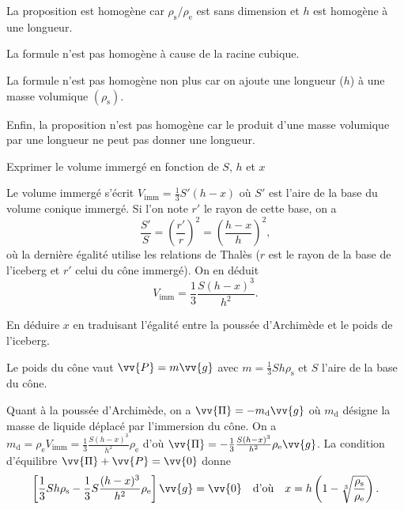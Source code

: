 \reponse{\reponseA}

\begin{corrige}
La proposition \reponseA{} est homogène car $\rho_\text{s}/\rho_\text{e}$ est sans dimension et $h$ est homogène à une longueur.

La formule \reponseB{} n'est pas homogène à cause de la racine cubique.

La formule \reponseC{} n'est pas homogène non plus car on ajoute une longueur ($h$) à une masse volumique $(\rho_\text{s})$.

Enfin, la proposition \reponseD{} n'est pas homogène car le produit d'une masse volumique par une longueur ne peut pas donner une longueur.
\end{corrige}

\begin{enonce}
Exprimer le volume immergé en fonction de $S$, $h$ et $x$
\end{enonce}


\begin{corrige}
Le volume immergé s'écrit $V_\text{imm}=\frac13 S'(h-x)$ où $S'$ est l'aire de la base du volume conique immergé. Si l'on note $r'$ le rayon de cette base, on a 
\[
\frac{S'}{S}=\left(\frac{r'}{r}\right)^2=\left(\frac{h-x}{h}\right)^2,	
\]
où la dernière égalité utilise les relations de Thalès ($r$ est le rayon de la base de l'iceberg et $r'$ celui du cône immergé). On en déduit 
\[
V_\text{imm}=\frac13 \frac{S(h-x)^3}{h^2}.
\]
\end{corrige}


\begin{enonce}
En déduire $x$ en traduisant l'égalité entre la poussée d'Archimède et le poids de l'iceberg.\\\mbox{}
\end{enonce}


\begin{corrige}
Le poids du cône vaut $\vv{P}=m\vv{g}$ avec $m=\frac13 Sh\rho_\text{s}$ et $S$ l'aire de la base du cône.

Quant à la poussée d'Archimède, on a $\vv{\Pi}=-m_\text{d}\vv{g}$ où $m_\text{d}$ désigne la masse de liquide déplacé par l'immersion du cône. On a $m_\text{d}=\rho_\text{e}V_\text{imm}=\frac13 \frac{S(h-x)^3}{h^2}\rho_\text{e}$ d'où $\vv{\Pi}=-\frac13 \frac{S(h-x)^3}{h^2}\rho_\text{e}\vv{g}
$. 
La condition d'équilibre $\vv{\Pi}+\vv{P}=\vv{0}$ donne 
\[
\left[\frac13 Sh\rho_\text{s}-\frac13 S\frac{(h-x)^3}{h^2}\rho_\text{e}\right]\vv{g}=\vv{0}
\quad\text{d'où}\quad
x=h\left(1-\sqrt[3]{\frac{\rho_\text{s}}{\rho_\text{e}}}\right).
\]
\end{corrige}

